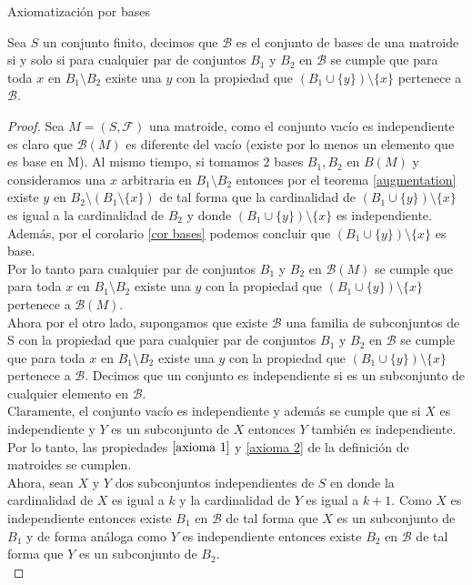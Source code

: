 \begin{teo}{Axiomatización por bases} \label{abases}

Sea $S$ un conjunto finito, decimos que $\mathcal{B}$ es el conjunto de bases de una matroide si y solo si para cualquier par de conjuntos $B_1$ y $B_2$ en $\mathcal{B}$ se cumple que para toda $x$ en $B_1 \setminus B_2$ existe una $y$ con la propiedad que $(B_1 \cup \{y\}) \setminus \{x\}$ pertenece a $\mathcal{B}$. 
\end{teo}
\begin{proof}
Sea $M=(S,\mathcal{F})$ una matroide, como el conjunto vacío es independiente es claro que $\mathcal{B}(M)$ es diferente del vacío (existe por lo menos un elemento que es base en M). Al mismo tiempo, si tomamos 2 bases $B_1, B_2$ en $B(M)$ y consideramos una $x$ arbitraria en $B_1 \setminus B_2$ entonces por el teorema \ref{augmentation} existe $y$ en $B_2 \setminus (B_1 \setminus \{x\})$ de tal forma que la cardinalidad de $(B_1 \cup \{y\}) \setminus \{x\}$ es igual a la cardinalidad de $B_2$ y donde $(B_1 \cup \{y\}) \setminus \{x\}$ es independiente. Además, por el corolario \ref{cor bases} podemos concluir que $(B_1 \cup \{y\}) \setminus \{x\}$ es base. \\
Por lo tanto para cualquier par de conjuntos $B_1$ y $B_2$ en $\mathcal{B}(M)$ se cumple que para toda $x$ en $B_1 \setminus B_2$ existe una $y$ con la propiedad que $(B_1 \cup \{y\}) \setminus \{x\}$ pertenece a $\mathcal{B}(M)$.\\
Ahora por el otro lado, supongamos que existe $\mathcal{B}$ una familia de subconjuntos de S con la propiedad que para cualquier par de conjuntos $B_1$ y $B_2$ en $\mathcal{B}$ se cumple que para toda $x$ en $B_1 \setminus B_2$ existe una $y$ con la propiedad que $(B_1 \cup \{y\}) \setminus \{x\}$ pertenece a $\mathcal{B}$. Decimos que un conjunto es independiente si es un subconjunto de cualquier elemento en $\mathcal{B}$. \\
Claramente, el conjunto vacío es independiente y además se cumple que si $X$ es independiente y $Y$ es un subconjunto de $X$ entonces $Y$ también es independiente. Por lo tanto, las propiedades $\ref{axioma 1}$ y \ref{axioma 2} de la definición de matroides se cumplen. \\
Ahora, sean $X$ y $Y$ dos subconjuntos independientes de $S$ en donde la cardinalidad de $X$ es igual a $k$ y la cardinalidad de $Y$ es igual a $k+1$. Como $X$ es independiente entonces existe $B_1$ en $\mathcal{B}$ de tal forma que $X$ es un subconjunto de $B_1$ y de forma análoga como $Y$ es independiente entonces existe $B_2$ en $\mathcal{B}$ de tal forma que $Y$ es un subconjunto de $B_2$. \\

\end{proof}
